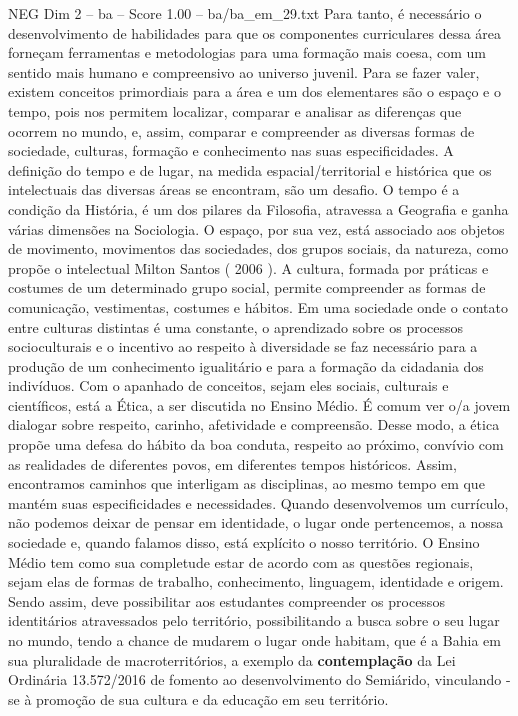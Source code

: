 \begin{textsample}{NEG Dim 2 – ba – Score 1.00 – ba/ba\_em\_29.txt}
Para tanto, é necessário o desenvolvimento de habilidades para que os componentes curriculares dessa área forneçam ferramentas e metodologias para uma formação mais coesa, com um sentido mais humano e compreensivo ao universo juvenil.
Para se fazer valer, existem conceitos primordiais para a área e um dos elementares são o espaço e o tempo, pois nos permitem localizar, comparar e analisar as diferenças que ocorrem no mundo, e, assim, comparar e compreender as diversas formas de sociedade, culturas, formação e conhecimento nas suas especificidades.
A definição do tempo e de lugar, na medida espacial/territorial e histórica que os intelectuais das diversas áreas se encontram, são um desafio.
O tempo é a condição da História, é um dos pilares da Filosofia, atravessa a Geografia e ganha várias dimensões na Sociologia.
O espaço, por sua vez, está associado aos objetos de movimento, movimentos das sociedades, dos grupos sociais, da natureza, como propõe o intelectual Milton Santos ( 2006 ).
A cultura, formada por práticas e costumes de um determinado grupo social, permite compreender as formas de comunicação, vestimentas, costumes e hábitos.
Em uma sociedade onde o contato entre culturas distintas é uma constante, o aprendizado sobre os processos socioculturais e o incentivo ao respeito à diversidade se faz necessário para a produção de um conhecimento igualitário e para a formação da cidadania dos indivíduos.
Com o apanhado de conceitos, sejam eles sociais, culturais e científicos, está a Ética, a ser discutida no Ensino Médio.
É comum ver o/a jovem dialogar sobre respeito, carinho, afetividade e compreensão.
Desse modo, a ética propõe uma defesa do hábito da boa conduta, respeito ao próximo, convívio com as realidades de diferentes povos, em diferentes tempos históricos.
Assim, encontramos caminhos que interligam as disciplinas, ao mesmo tempo em que mantém suas especificidades e necessidades.
Quando desenvolvemos um currículo, não podemos deixar de pensar em identidade, o lugar onde pertencemos, a nossa sociedade e, quando falamos disso, está explícito o nosso território.
O Ensino Médio tem como sua completude estar de acordo com as questões regionais, sejam elas de formas de trabalho, conhecimento, linguagem, identidade e origem.
Sendo assim, deve possibilitar aos estudantes compreender os processos identitários atravessados pelo território, possibilitando a busca sobre o seu lugar no mundo, tendo a chance de mudarem o lugar onde habitam, que é a Bahia em sua pluralidade de macroterritórios, a exemplo da \textbf{contemplação} da Lei Ordinária 13.572/2016 de fomento ao desenvolvimento do Semiárido, vinculando -se à promoção de sua cultura e da educação em seu território.

\end{textsample}
